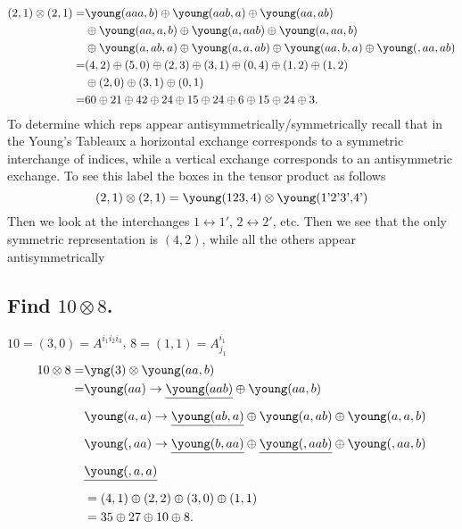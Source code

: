 \documentclass[main.tex]{subfiles}
\begin{document}
\begin{align}
(2,1)\otimes(2,1)=
&\young(\hfil\hfil\hfil aaa,\hfil b)\oplus
\young(\hfil\hfil\hfil aab,\hfil a) \oplus 
\young(\hfil\hfil\hfil aa,\hfil ab) \nonumber\\&\oplus 
\young(\hfil\hfil\hfil aa,\hfil a,b)\oplus
\young(\hfil\hfil\hfil a,\hfil aab)\oplus
\young(\hfil\hfil\hfil a,\hfil aa,b)\nonumber\\&\oplus
\young(\hfil\hfil\hfil a,\hfil ab,a)\oplus
\young(\hfil\hfil\hfil a,\hfil a,ab)\oplus
\young(\hfil\hfil\hfil aa,\hfil b,a)\oplus
\young(\hfil\hfil\hfil ,\hfil aa,ab)\\
=&(4,2)\oplus(5,0)\oplus(2,3)\oplus(3,1)\oplus(0,4)\oplus(1,2)\oplus(1,2)\nonumber\\&\oplus(2,0)\oplus(3,1)\oplus(0,1)\\
=&60\oplus21\oplus42\oplus24\oplus15\oplus24\oplus6\oplus15\oplus24\oplus3.
\end{align}
To determine which reps appear antisymmetrically/symmetrically recall that in the Young's Tableaux a horizontal exchange corresponds to a symmetric interchange of indices, while a vertical exchange corresponds to an antisymmetric exchange. To see this label the boxes in the tensor product as follows 
\begin{equation}
(2,1)\otimes(2,1)=\young(123,4)\otimes\young(\oneprime \twoprime \threeprime,\fourprime)\\
\end{equation}
Then we look at the interchanges $1\leftrightarrow1'$, $2\leftrightarrow2'$, etc. Then we see that the only symmetric representation is $(4,2)$, while all the others appear antisymmetrically


\subsection{Find $10\otimes8$.}
$10=(3,0)=A^{i_1i_2i_3}$, $8=(1,1)=A^{i_1}_{j_1}$
\begin{align}
10\otimes8=&\yng(3)\otimes\young(aa,b)\\
=&\young(\hfil\hfil\hfil aa) \rightarrow \sout{\young(\hfil\hfil\hfil aab)}\oplus\young(\hfil\hfil\hfil aa,b)\nonumber\\
&\young(\hfil\hfil\hfil a,a)\rightarrow\sout{\young(\hfil\hfil\hfil ab,a)}\oplus\young(\hfil\hfil\hfil a,ab)\oplus\young(\hfil\hfil\hfil a,a,b)\nonumber\\
&\young(\hfil\hfil\hfil ,aa)\rightarrow\sout{\young(\hfil\hfil\hfil b,aa)}\oplus\sout{\young(\hfil\hfil\hfil ,aab)}\oplus\young(\hfil\hfil\hfil ,aa,b)\\
&\sout{\young(\hfil\hfil\hfil ,a,a)}\\
&=(4,1)\oplus(2,2)\oplus(3,0)\oplus(1,1)\nonumber\\
&=35\oplus27\oplus10\oplus8.
\end{align}
\end{document}
